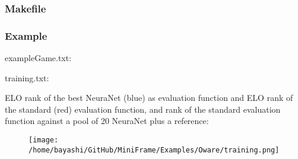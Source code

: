 \begin{scriptsize}
\begin{ttfamily}

\end{ttfamily}
\end{scriptsize}

\subsubsection{Makefile}

\begin{scriptsize}
\begin{ttfamily}

\end{ttfamily}
\end{scriptsize}

\subsubsection{Example}

exampleGame.txt:\\
\begin{scriptsize}
\begin{ttfamily}

\end{ttfamily}
\end{scriptsize}

training.txt:\\
\begin{scriptsize}
\begin{ttfamily}

\end{ttfamily}
\end{scriptsize}

ELO rank of the best NeuraNet (blue) as evaluation function and ELO rank of the standard (red) evaluation function, and rank of the standard evaluation function against a pool of 20 NeuraNet plus a reference:\\

\begin{center}
\begin{figure}[H]
\centering\texttt{[image: /home/bayashi/GitHub/MiniFrame/Examples/Oware/training.png]}\\
\end{figure}
\end{center}
